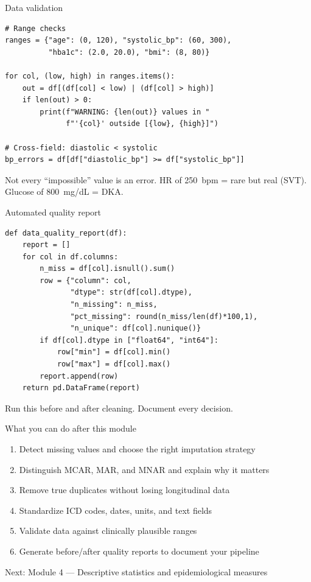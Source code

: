 \documentclass[aspectratio=169,11pt]{beamer}
\begin{document}
\begin{frame}[fragile]{Data validation}
\begin{verbatim}
# Range checks
ranges = {"age": (0, 120), "systolic_bp": (60, 300),
          "hba1c": (2.0, 20.0), "bmi": (8, 80)}

for col, (low, high) in ranges.items():
    out = df[(df[col] < low) | (df[col] > high)]
    if len(out) > 0:
        print(f"WARNING: {len(out)} values in "
              f"'{col}' outside [{low}, {high}]")

# Cross-field: diastolic < systolic
bp_errors = df[df["diastolic_bp"] >= df["systolic_bp"]]
\end{verbatim}

\vspace{4pt}
Not every ``impossible'' value is an error. HR of 250~bpm = rare but real (SVT). Glucose of 800~mg/dL = DKA.
\end{frame}

\begin{frame}[fragile]{Automated quality report}
\begin{verbatim}
def data_quality_report(df):
    report = []
    for col in df.columns:
        n_miss = df[col].isnull().sum()
        row = {"column": col,
               "dtype": str(df[col].dtype),
               "n_missing": n_miss,
               "pct_missing": round(n_miss/len(df)*100,1),
               "n_unique": df[col].nunique()}
        if df[col].dtype in ["float64", "int64"]:
            row["min"] = df[col].min()
            row["max"] = df[col].max()
        report.append(row)
    return pd.DataFrame(report)
\end{verbatim}

Run this \alert{before and after} cleaning. Document every decision.
\end{frame}

\begin{frame}{What you can do after this module}
\begin{enumerate}
  \item Detect missing values and choose the right imputation strategy
  \item Distinguish MCAR, MAR, and MNAR and explain why it matters
  \item Remove true duplicates without losing longitudinal data
  \item Standardize ICD codes, dates, units, and text fields
  \item Validate data against clinically plausible ranges
  \item Generate before/after quality reports to document your pipeline
\end{enumerate}

\vspace{12pt}
\centering
\Large \alert{Next: Module 4 --- Descriptive statistics and epidemiological measures}
\end{frame}
\end{document}
